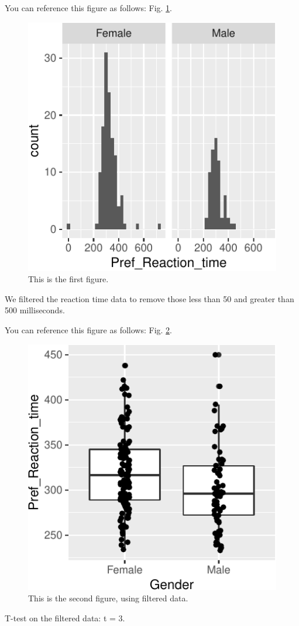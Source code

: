 \documentclass[12pt,halfline,a4paper,]{ouparticle}
\begin{document}
You can reference this figure as follows: Fig. \ref{fig:prt-histograms}.

\begin{figure}[p]

{\centering \includegraphics[width=0.5\linewidth]{manuscript_reaction_times_2020_files/figure-latex/prt-histograms-1} 

}

\caption{This is the first figure.}\label{fig:prt-histograms}
\end{figure}

We filtered the reaction time data to remove those less than 50 and
greater than 500 milliseconds.

You can reference this figure as follows: Fig. \ref{fig:prt-boxplot}.

\begin{figure}[p]

{\centering \includegraphics[width=0.5\linewidth]{manuscript_reaction_times_2020_files/figure-latex/prt-boxplot-1} 

}

\caption{This is the second figure, using filtered data.}\label{fig:prt-boxplot}
\end{figure}

T-test on the filtered data: t = 3.
\end{document}

